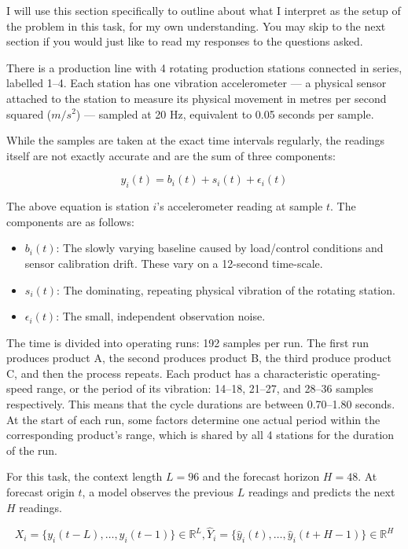\documentclass[11pt, a4paper]{article}
\begin{document}
I will use this section specifically to outline about what I interpret as the setup of the problem in this task, for my own understanding. You may skip to the next section if you would just like to read my responses to the questions asked.

There is a production line with 4 rotating production stations connected in series, labelled 1--4. Each station has one vibration accelerometer --- a physical sensor attached to the station to measure its physical movement in metres per second squared ($m/s^2$) --- sampled at 20 Hz, equivalent to 0.05 seconds per sample.

While the samples are taken at the exact time intervals regularly, the readings itself are not exactly accurate and are the sum of three components:

$$y_i(t) = b_i(t) + s_i(t) + \epsilon_i(t)$$

The above equation is station $i$'s accelerometer reading at sample $t$. The components are as follows:

\begin{itemize}
  \item $b_i(t)$: The slowly varying baseline caused by load/control conditions and sensor calibration drift. These vary on a 12-second time-scale.
  \item $s_i(t)$: The dominating, repeating physical vibration of the rotating station.
  \item $\epsilon_i(t)$: The small, independent observation noise.
\end{itemize}

The time is divided into operating runs: 192 samples per run. The first run produces product A, the second produces product B, the third produce product C, and then the process repeats. Each product has a characteristic operating-speed range, or the period of its vibration: 14--18, 21--27, and 28--36 samples respectively. This means that the cycle durations are between 0.70--1.80 seconds. At the start of each run, some factors determine one actual period within the corresponding product's range, which is shared by all 4 stations for the duration of the run.

For this task, the context length $L = 96$ and the forecast horizon $H = 48$. At forecast origin $t$, a model observes the previous $L$ readings and predicts the next $H$ readings.

$$X_i = \{y_i(t - L), \hdots, y_i(t - 1)\} \in \mathbb{R}^L, \hat{Y}_i = \{\hat{y}_i(t), \hdots, \hat{y}_i(t + H - 1)\} \in \mathbb{R}^H$$
\end{document}
